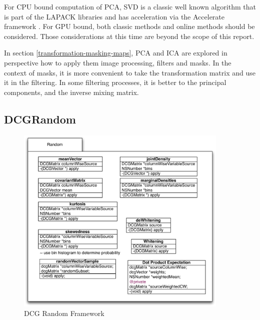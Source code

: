 \documentclass[12pt ]{article}
\begin{document}

For CPU bound computation of PCA, SVD is a classic well known algorithm that is part of the LAPACK libraries and has  acceleration via the Accelerate framework \cite{apple-accelerate-framework}.  For GPU bound, both classic methods and online methods should be considered.  Those considerations at this time are beyond the scope of this report. 

In section \ref{transformation-masking-maps}, PCA and ICA are explored in perspective how to apply them image processing, filters and masks.  In the context of masks, it is more convenient to take the transformation matrix and use it in the filtering.  In some filtering processes, it is better to the principal components, and the inverse mixing matrix.




\subsection{DCGRandom}
\begin{figure}[htbp] %
   \centering
   \includegraphics[width=4in]{randomFramework.pdf} 
   \caption{DCG Random Framework}
   \label{fig-random-framework}
\end{figure}
\end{document}
